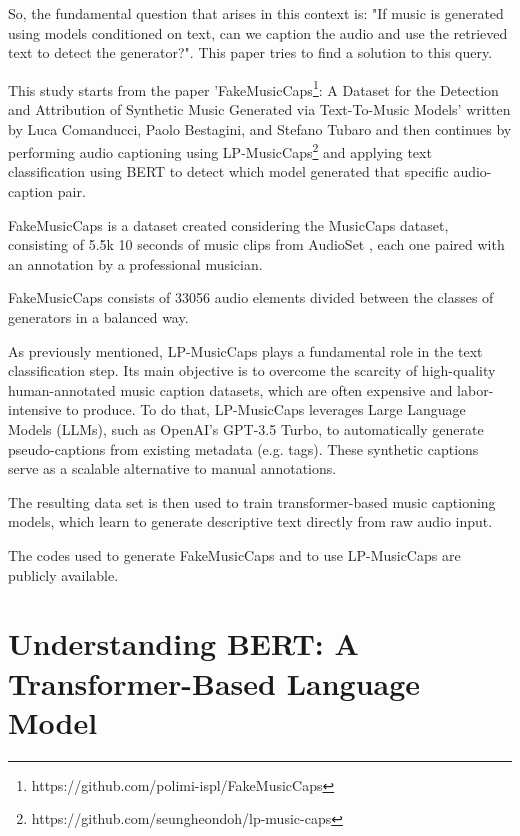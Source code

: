 \documentclass[conference]{IEEEtran}  %
\begin{document}
So, the fundamental question that arises in this context is:
"If music is generated using models conditioned on text, can we caption the audio and use the retrieved text to detect the generator?". 
This paper tries to find a solution to this query. 

This study starts from the paper 'FakeMusicCaps\footnote{https://github.com/polimi-ispl/FakeMusicCaps}: A Dataset for the Detection and Attribution of Synthetic Music Generated via Text-To-Music Models' written by Luca Comanducci, Paolo Bestagini, and Stefano Tubaro \cite{comanducci2024fakemusiccapsdatasetdetectionattribution} and then continues by performing audio captioning using LP-MusicCaps\footnote{https://github.com/seungheondoh/lp-music-caps}
 \cite{doh2023lpmusiccapsllmbasedpseudomusic} and applying text classification using BERT \cite{mohan2022finetunebert} to detect which model generated that specific audio-caption pair.

FakeMusicCaps \cite{comanducci2024fakemusiccapsdatasetdetectionattribution} is a dataset created considering the MusicCaps \cite{agostinelli2023musiclm} dataset,
consisting of 5.5k 10 seconds of music clips from AudioSet \cite{7952261}, each
one paired with an annotation by a professional musician.

FakeMusicCaps consists of 33056 audio elements divided between the classes of generators in a balanced way. 

As previously mentioned, LP-MusicCaps \cite{doh2023lpmusiccapsllmbasedpseudomusic} plays a fundamental role in the text classification step. Its main objective is to overcome the scarcity of high-quality human-annotated music caption datasets, which are often expensive and labor-intensive to produce. To do that, LP-MusicCaps leverages Large Language Models (LLMs), such as OpenAI’s GPT-3.5 Turbo, to automatically generate pseudo-captions from existing metadata (e.g. tags). These synthetic captions serve as a scalable alternative to manual annotations.

The resulting data set is then used to train transformer-based music captioning models, which learn to generate descriptive text directly from raw audio input.

The codes used to generate FakeMusicCaps and to use LP-MusicCaps are publicly available.

\section{Understanding BERT: A Transformer-Based Language Model}
\end{document}
